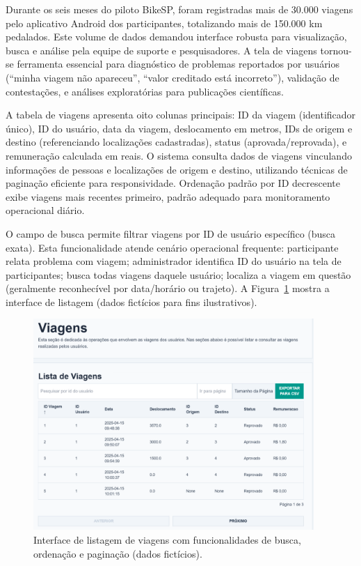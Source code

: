 

Durante os seis meses do piloto BikeSP, foram registradas mais de 30.000 viagens pelo aplicativo Android dos participantes, totalizando mais de 150.000 km pedalados. Este volume de dados demandou interface robusta para visualização, busca e análise pela equipe de suporte e pesquisadores. A tela de viagens tornou-se ferramenta essencial para diagnóstico de problemas reportados por usuários (``minha viagem não apareceu'', ``valor creditado está incorreto''), validação de contestações, e análises exploratórias para publicações científicas.

A tabela de viagens apresenta oito colunas principais: ID da viagem (identificador único), ID do usuário, data da viagem, deslocamento em metros, IDs de origem e destino (referenciando localizações cadastradas), status (aprovada/reprovada), e remuneração calculada em reais. O sistema consulta dados de viagens vinculando informações de pessoas e localizações de origem e destino, utilizando técnicas de paginação eficiente para responsividade. Ordenação padrão por ID decrescente exibe viagens mais recentes primeiro, padrão adequado para monitoramento operacional diário.

O campo de busca permite filtrar viagens por ID de usuário específico (busca exata). Esta funcionalidade atende cenário operacional frequente: participante relata problema com viagem; administrador identifica ID do usuário na tela de participantes; busca todas viagens daquele usuário; localiza a viagem em questão (geralmente reconhecível por data/horário ou trajeto). A Figura~\ref{fig:viagens_listar} mostra a interface de listagem (dados fictícios para fins ilustrativos).

 \begin{figure}[htb]
   \centering
   \includegraphics[width=0.95\textwidth]{figuras/viagens_listar.png}
   \caption{Interface de listagem de viagens com funcionalidades de busca, ordenação e paginação (dados fictícios).}
   \label{fig:viagens_listar}
 \end{figure}


